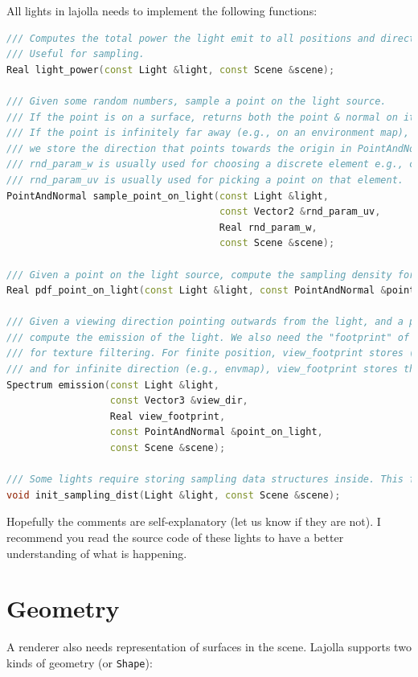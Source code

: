 All lights in lajolla needs to implement the following functions:
\begin{lstlisting}[language=c++]
/// Computes the total power the light emit to all positions and directions.
/// Useful for sampling.
Real light_power(const Light &light, const Scene &scene);

/// Given some random numbers, sample a point on the light source.
/// If the point is on a surface, returns both the point & normal on it.
/// If the point is infinitely far away (e.g., on an environment map),
/// we store the direction that points towards the origin in PointAndNormal.normal.
/// rnd_param_w is usually used for choosing a discrete element e.g., choosing a triangle in a mesh light.
/// rnd_param_uv is usually used for picking a point on that element.
PointAndNormal sample_point_on_light(const Light &light, 
                                     const Vector2 &rnd_param_uv,
                                     Real rnd_param_w,
                                     const Scene &scene);

/// Given a point on the light source, compute the sampling density for the function above.
Real pdf_point_on_light(const Light &light, const PointAndNormal &point_on_light, const Scene &scene);

/// Given a viewing direction pointing outwards from the light, and a point on the light,
/// compute the emission of the light. We also need the "footprint" of the ray
/// for texture filtering. For finite position, view_footprint stores (approximatedly) du/dx
/// and for infinite direction (e.g., envmap), view_footprint stores the approximated ddir/dx.
Spectrum emission(const Light &light,
                  const Vector3 &view_dir,
                  Real view_footprint,
                  const PointAndNormal &point_on_light,
                  const Scene &scene);

/// Some lights require storing sampling data structures inside. This function initialize them.
void init_sampling_dist(Light &light, const Scene &scene);
\end{lstlisting}

Hopefully the comments are self-explanatory (let us know if they are not). I recommend you read the source code of these lights to have a better understanding of what is happening.

\section{Geometry}
A renderer also needs representation of surfaces in the scene. Lajolla supports two kinds of geometry (or \lstinline{Shape}):

